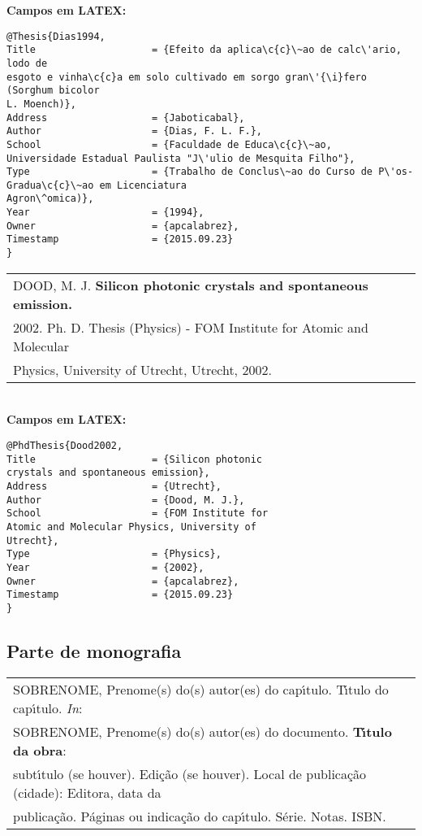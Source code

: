 \textbf{Campos em LATEX:} 

\begin{verbatim}
@Thesis{Dias1994,
Title                    = {Efeito da aplica\c{c}\~ao de calc\'ario, lodo de 
esgoto e vinha\c{c}a em solo cultivado em sorgo gran\'{\i}fero (Sorghum bicolor 
L. Moench)},
Address                  = {Jaboticabal},
Author                   = {Dias, F. L. F.},
School                   = {Faculdade de Educa\c{c}\~ao, 
Universidade Estadual Paulista "J\'ulio de Mesquita Filho"},
Type                     = {Trabalho de Conclus\~ao do Curso de P\'os-Gradua\c{c}\~ao em Licenciatura
Agron\^omica)},
Year                     = {1994},
Owner                    = {apcalabrez},
Timestamp                = {2015.09.23}
}
\end{verbatim}


\begin{tabular}{|l|c|} \hline
	DOOD, M. J. \textbf{Silicon photonic crystals and spontaneous emission.} \\ 2002.
	 Ph. D. Thesis (Physics) - FOM Institute for Atomic and Molecular
	 \\ Physics, University of Utrecht, Utrecht, 2002.    \\\hline
\end{tabular} \\

\textbf{Campos em LATEX:} \\

\begin{verbatim}
@PhdThesis{Dood2002,
Title                    = {Silicon photonic
crystals and spontaneous emission},
Address                  = {Utrecht},
Author                   = {Dood, M. J.},
School                   = {FOM Institute for
Atomic and Molecular Physics, University of
Utrecht},
Type                     = {Physics},
Year                     = {2002},
Owner                    = {apcalabrez},
Timestamp                = {2015.09.23}
}
\end{verbatim}

\subsection{Parte de monografia}	

\begin{tabular}{|l|c|} \hline
	SOBRENOME, Prenome(s) do(s) autor(es) do cap\'{\i}tulo. T\'{\i}tulo do cap\'{\i}tulo. \textit{In}: \\ SOBRENOME, Prenome(s) do(s) autor(es) do documento. \textbf{T\'{\i}tulo da obra}: \\ subt\'{\i}tulo (se houver). Edi\c{c}\~ao (se houver). Local de publica\c{c}\~ao (cidade): Editora, data da\\ publica\c{c}\~ao. P\'aginas ou indica\c{c}\~ao do cap\'{\i}tulo. S\'erie. Notas. ISBN.     \\\hline
\end{tabular} \\

